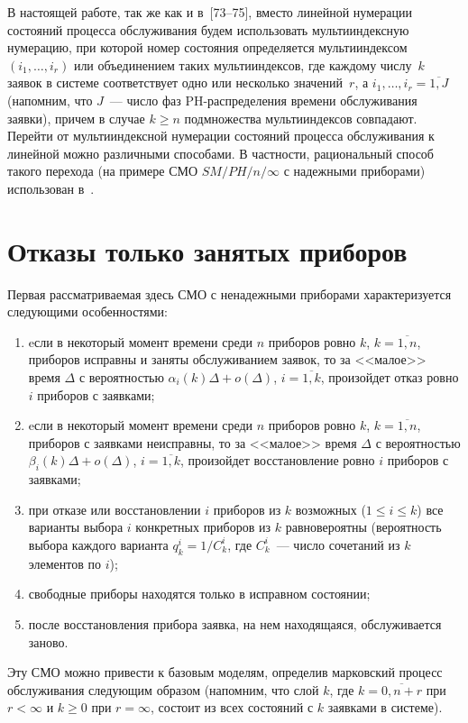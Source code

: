 \begin{multicols}{2}
В настоящей работе, так же как и в~[73--75],
вмес\-то линейной нумерации состояний процесса обслуживания будем
использовать мультииндексную нумерацию, при которой номер состояния
определяется мультииндексом $(i_1,\ldots,i_r)$ или объединением таких
мультииндексов, где каждому чис\-лу~$k$ заявок в системе соответствует
одно или несколько значений~$r$, а $i_1,\ldots,i_r=\overline{1,J}$
(напомним, что $J$~--- чис\-ло фаз PH-распределения времени
обслуживания заявки), причем в случае $k\ge n$ подмножества
мультииндексов совпадают.
Перейти от мультииндексной нумерации состояний процесса обслуживания
к линейной можно различными способами.
В частности, рациональный способ такого перехода (на примере СМО
$SM/PH/n/\infty$ с надежными приборами) использован в~\cite{PC04,PC03}.

\section{Отказы только занятых приборов}

Первая рассматриваемая здесь СМО с ненадежными приборами
характеризуется следующими особенностями:
\begin{enumerate}[(1)]
\item  eсли в некоторый момент времени среди $n$ приборов ровно $k$,
$k=\overline{1,n}$, приборов исправны и заняты обслуживанием заявок,
то за <<малое>> время $\Delta$ с вероятностью
$\alpha_i(k)\Delta+o(\Delta)$, $i=\overline{1,k}$, произойдет
отказ ровно $i$ приборов с заявками;
\item
eсли в некоторый момент времени среди $n$ приборов ровно $k$,
$k=\overline{1,n}$, приборов с заявками неисправны, то за <<малое>>
время $\Delta$ с вероятностью $\beta_i(k)\Delta+o(\Delta)$,
$i=\overline{1,k}$, произойдет восстановление ровно $i$ приборов с
заявками;
\item
 при отказе или восстановлении $i$ приборов из $k$ возможных
($1\le i\le k$) все варианты выбора $i$ конкретных приборов из
$k$ равновероятны (вероятность выбора каждого варианта
$q^{i}_{k}=1/C^i_k$, где $C^i_k$~--- число сочетаний из $k$
элементов по $i$);
\item
свободные приборы находятся только в исправном состоянии;
\item
после восстановления прибора заявка, на нем находящаяся,
обслуживается заново.
\end{enumerate}

Эту СМО можно привести к базовым моделям, определив марковский
процесс обслуживания следующим образом (напомним, что слой
$k$, где $k=\overline{0,n+r}$ при $r<\infty$ и $k\ge 0$ при
$r=\infty$, состоит из всех состояний с $k$ заявками в системе).


\end{multicols}
